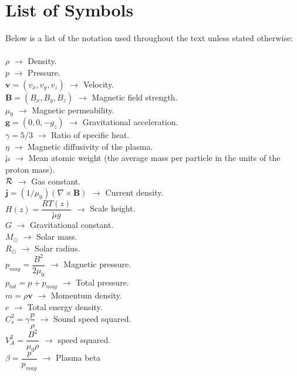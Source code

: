 \section*{List of Symbols}
Below is a list of the notation used throughout the text unless stated otherwise: \\ \\
$\rho$ $\rightarrow$ Density.  \\
$p$ $\rightarrow$ Pressure. \\
$\boldsymbol{v} = (v_x, v_y, v_z)$ $\rightarrow$ Velocity.  \\
$\boldsymbol{B} = (B_x,B_y,B_z)$ $\rightarrow$ Magnetic field strength. \\
$\mu_0$ $\rightarrow$ Magnetic permeability. \\
$\boldsymbol{g} = (0,0,-g_z)$ $\rightarrow$ Gravitational acceleration. \\
$\gamma = 5/3$ $\rightarrow$ Ratio of specific heat. \\
$\eta$ $\rightarrow$ Magnetic diffusivity of the plasma. \\
$\widetilde{\mu}$ $\rightarrow$ Mean atomic weight (the average mass per particle in the units of the proton mass).  \\
$\mathcal{R}$ $\rightarrow$ Gas constant.\\
$\boldsymbol{j} = (1 / \mu_0) (\nabla \times \boldsymbol{B})$ $\rightarrow$ Current density.  \\
$H(z) = \dfrac{R T(z)}{\widetilde{\mu} g}$ $\rightarrow$ Scale height.  \\
$G$ $\rightarrow$ Gravitational constant. \\
$M_{\odot}$ $\rightarrow$ Solar mass. \\
$R_{\odot}$ $\rightarrow$ Solar radius. \\
$p_{mag} = \dfrac{B^2}{2 \mu_0} $ $\rightarrow$ Magnetic pressure. \\
$p_{tot} = p + p_{mag} $ $\rightarrow$ Total pressure. \\
$m = \rho \boldsymbol{v}$ $\rightarrow$ Momentum density. \\
$e$ $\rightarrow$ Total energy density. \\ 
$C^2_s = \gamma \dfrac{p}{\rho}$ $\rightarrow$ Sound speed squared. \\ 
$V_A^2=\dfrac{B^2}{\mu_0 \rho}$ $\rightarrow$ \Alfven speed squared.  \\
$\beta=\dfrac{p}{p_{mag}}$ $\rightarrow$ Plasma beta
\clearpage
\setcounter{page}{1}
